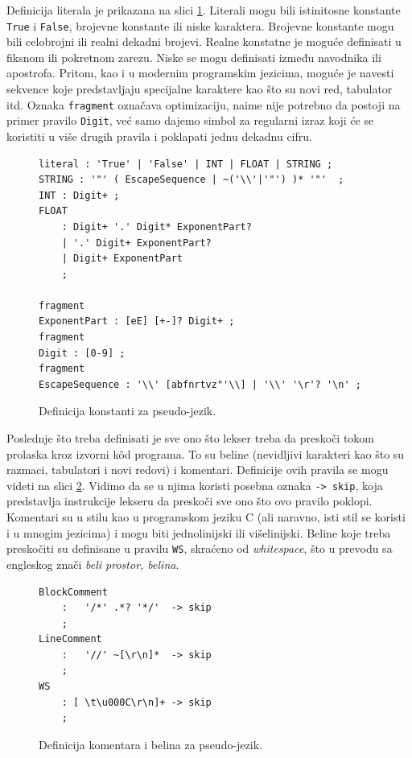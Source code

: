 Definicija literala je prikazana na slici \ref{fig:PseudoDef7}. Literali mogu bili istinitosne konstante \texttt{True} i \texttt{False}, brojevne konstante ili niske karaktera. Brojevne konstante mogu bili celobrojni ili realni dekadni brojevi. Realne konstatne je moguće definisati u fiksnom ili pokretnom zarezu. Niske se mogu definisati između navodnika ili apostrofa. Pritom, kao i u modernim programskim jezicima, moguće je navesti sekvence koje predstavljaju specijalne karaktere kao što su novi red, tabulator itd. Oznaka \texttt{fragment} označava optimizaciju, naime nije potrebno da postoji na primer pravilo \texttt{Digit}, već samo dajemo simbol za regularni izraz koji će se koristiti u više drugih pravila i poklapati jednu dekadnu cifru.

\begin{figure}[h!]
\begin{lstlisting}[language={}]
literal : 'True' | 'False' | INT | FLOAT | STRING ;
STRING : '"' ( EscapeSequence | ~('\\'|'"') )* '"'  ;
INT : Digit+ ;
FLOAT
    : Digit+ '.' Digit* ExponentPart?
    | '.' Digit+ ExponentPart?
    | Digit+ ExponentPart
    ;

fragment
ExponentPart : [eE] [+-]? Digit+ ;
fragment
Digit : [0-9] ;
fragment
EscapeSequence : '\\' [abfnrtvz"'\\] | '\\' '\r'? '\n' ;
\end{lstlisting}
\caption{Definicija konstanti za pseudo-jezik.}
\label{fig:PseudoDef7}
\end{figure}

Poslednje što treba definisati je sve ono što lekser treba da preskoči tokom prolaska kroz izvorni k\^od programa. To su beline (nevidljivi karakteri kao što su razmaci, tabulatori i novi redovi) i komentari. Definicije ovih pravila se mogu videti na slici \ref{fig:PseudoDef8}. Vidimo da se u njima koristi posebna oznaka \texttt{-> skip}, koja predstavlja instrukcije lekseru da preskoči sve ono što ovo pravilo poklopi. Komentari su u stilu kao u programskom jeziku C (ali naravno, isti stil se koristi i u mnogim jezicima) i mogu biti jednolinijski ili višelinijski. Beline koje treba preskočiti su definisane u pravilu \texttt{WS}, skraćeno od \emph{whitespace}, što u prevodu sa engleskog znači \emph{beli prostor, belina}.

\begin{figure}[h!]
\begin{lstlisting}[language={}]
BlockComment
    :   '/*' .*? '*/'  -> skip
    ;
LineComment
    :   '//' ~[\r\n]*  -> skip
    ;
WS  
    : [ \t\u000C\r\n]+ -> skip
    ;
\end{lstlisting}
\caption{Definicija komentara i belina za pseudo-jezik.}
\label{fig:PseudoDef8}
\end{figure}

